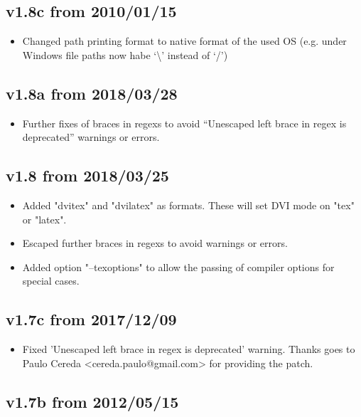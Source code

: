 \documentclass{article}
\begin{document}
\subsection*{v1.8c from 2010/01/15}
\begin{itemize}
 \item Changed path printing format to native format of the used OS 
      (e.g. under Windows file paths now habe `\textbackslash' instead of `/')
\end{itemize}

\subsection*{v1.8a from 2018/03/28}
\begin{itemize}
 \item Further fixes of braces in regexs to avoid ``Unescaped left brace in regex is deprecated'' warnings or errors.
\end{itemize}

\subsection*{v1.8 from 2018/03/25}
\begin{itemize}
 \item Added "dvitex" and "dvilatex" as formats. These will set DVI mode on "tex" or "latex".
 \item Escaped further braces in regexs to avoid warnings or errors.
 \item Added option "--texoptions" to allow the passing of compiler options for special cases.
\end{itemize}

\subsection*{v1.7c from 2017/12/09}
\begin{itemize}
 \item Fixed 'Unescaped left brace in regex is deprecated' warning.
   Thanks goes to Paulo Cereda <cereda.paulo@gmail.com> for providing the patch.
\end{itemize}

\subsection*{v1.7b from 2012/05/15}
\end{document}
